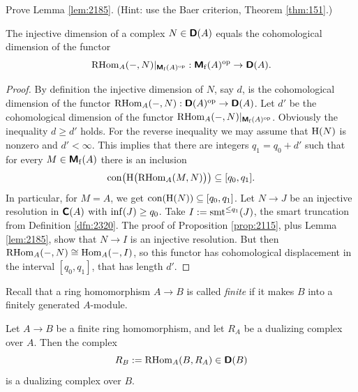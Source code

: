 \begin{exer} \label{exer:2185}
Prove Lemma \ref{lem:2185}. (Hint: use the Baer criterion, Theorem 
\ref{thm:151}.) 
\end{exer}

\begin{lem} \label{lem:2172} 
The injective dimension of a complex $N \in \boldsymbol{\mathsf{D}}(A)$ equals the 
cohomological dimension of the functor
\[ \operatorname{RHom}_{A}(-, N)|_{\boldsymbol{\mathsf{M}}_{\mathrm{f}}(A)^{\mathrm{op}}} : 
\boldsymbol{\mathsf{M}}_{\mathrm{f}}(A)^{\mathrm{op}} \to \boldsymbol{\mathsf{D}}(A) . \]
\end{lem}

\begin{proof}
By definition the injective dimension of $N$, say $d$,
is the cohomological dimension of the functor
$\operatorname{RHom}_{A}(-, N) : \boldsymbol{\mathsf{D}}(A)^{\mathrm{op}} \to \boldsymbol{\mathsf{D}}(A)$.
Let $d'$ be  the cohomological dimension of the functor
$\operatorname{RHom}_{A}(-, N)|_{\boldsymbol{\mathsf{M}}_{\mathrm{f}}(A)^{\mathrm{op}}}$. 
Obviously the inequality $d \geq d'$ holds. 
For the reverse inequality we may assume that $\operatorname{H}(N)$ is nonzero
and $d' < \infty$. This implies that there are integers $q_1 = q_0 + d'$
such that for every $M \in \boldsymbol{\mathsf{M}}_{\mathrm{f}}(A)$ there is an inclusion
\[ \operatorname{con} \bigl( \operatorname{H} \bigl( \operatorname{RHom}_{A}(M, N) \bigr) \bigr) \subseteq 
[q_0, q_1] . \]
In particular, for $M = A$, we get 
$\operatorname{con}(\operatorname{H}(N)) \subseteq [q_0, q_1]$. 
Let $N \to J$ be an injective resolution in 
$\boldsymbol{\mathsf{C}}(A)$ with $\operatorname{inf}(J) \geq q_0$.  
Take $I := \operatorname{smt}^{\leq q_1}(J)$, the smart truncation from
Definition \ref{dfn:2320}.
The proof of Proposition \ref{prop:2115}, plus Lemma \ref{lem:2185}, 
show that $N \to I$ is an injective resolution. But then 
$\operatorname{RHom}_{A}(-, N) \cong \operatorname{Hom}_{A}(-, I)$,
so this functor has cohomological displacement in the interval 
$[q_0, q_1]$, that has length $d'$. 
\end{proof}

Recall that a ring homomorphism $A \to B$ is called {\em finite} if it makes
$B$ into a finitely generated $A$-module.  

\begin{prop} \label{prop:2200}
Let $A \to B$ be a finite ring homomorphism, and let $R_A$ be a dualizing 
complex over $A$. Then the complex 
\[ R_B := \operatorname{RHom}_{A}(B, R_A) \in \boldsymbol{\mathsf{D}}(B) \]
is a dualizing complex over $B$. 
\end{prop}


